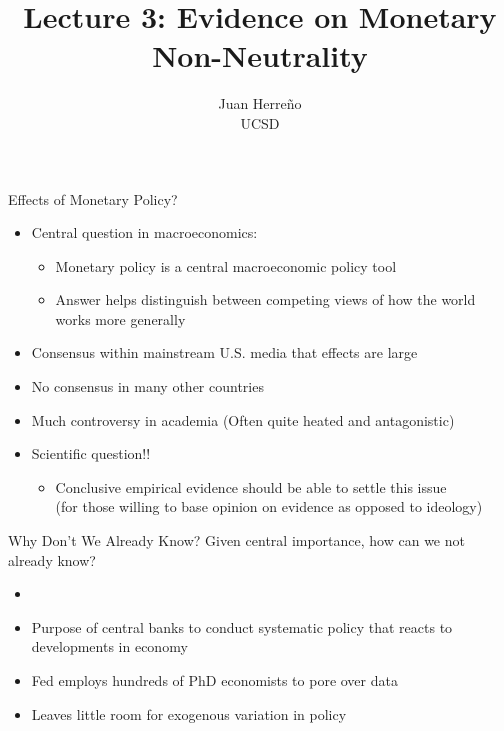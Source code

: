 \documentclass[11pt,aspectratio=169,xcolor={dvipsnames},hyperref={pdftex,pdfpagemode=UseNone,hidelinks,pdfdisplaydoctitle=true},usepdftitle=false]{beamer}
\title{Lecture 3: Evidence on Monetary Non-Neutrality}
\author{Juan Herre\~{n}o\\UCSD}
\begin{document}
\maketitle



\begin{frame}{Effects of Monetary Policy?}
\begin{itemize}
\item Central question in macroeconomics:
\begin{itemize}
\item Monetary policy is a central macroeconomic policy tool
\item Answer helps distinguish between competing views of how the world works more generally \pause
\end{itemize}
\item Consensus within mainstream U.S. media that effects are large
\item No consensus in many other countries
\item Much controversy in academia (Often quite heated and antagonistic) \pause
\item Scientific question!! 
\begin{itemize}
\item Conclusive empirical evidence should be able to settle this issue \\ (for those willing to base opinion on evidence as opposed to ideology)
\end{itemize}
\end{itemize}
\end{frame}


\begin{frame}{Why Don't We Already Know?}
Given central importance, how can we not already know? \pause
\begin{itemize}
\item {\color{red}{Changes in monetary policy occur for a reason!!}}
\item Purpose of central banks to conduct systematic policy that reacts to developments in economy
\item Fed employs hundreds of PhD economists to pore over data
\item Leaves little room for exogenous variation in policy
\end{itemize}
\end{frame}
 
\end{document}
